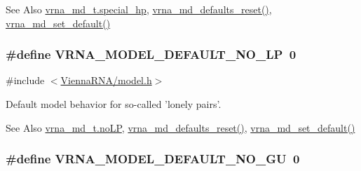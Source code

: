 \begin{DoxySeeAlso}{See Also}
\hyperlink{group__model__details_add64a96d23e77ef1d0ddf8dfc5228143}{vrna\-\_\-md\-\_\-t.\-special\-\_\-hp}, \hyperlink{group__model__details_ga70834424cf804d149937de89f80ceb45}{vrna\-\_\-md\-\_\-defaults\-\_\-reset()}, \hyperlink{group__model__details_ga8ac6ff84936282436f822644bf841f66}{vrna\-\_\-md\-\_\-set\-\_\-default()} 
\end{DoxySeeAlso}
\hypertarget{group__model__details_gab72462726dd60ed0d43339bbf7ee08ad}{
\subsubsection[{V\-R\-N\-A\-\_\-\-M\-O\-D\-E\-L\-\_\-\-D\-E\-F\-A\-U\-L\-T\-\_\-\-N\-O\-\_\-\-L\-P}]{\setlength{\rightskip}{0pt plus 5cm}\#define V\-R\-N\-A\-\_\-\-M\-O\-D\-E\-L\-\_\-\-D\-E\-F\-A\-U\-L\-T\-\_\-\-N\-O\-\_\-\-L\-P~0}}\label{group__model__details_gab72462726dd60ed0d43339bbf7ee08ad}


{\ttfamily \#include $<$\hyperlink{model_8h}{Vienna\-R\-N\-A/model.\-h}$>$}



Default model behavior for so-\/called 'lonely pairs'. 

\begin{DoxySeeAlso}{See Also}
\hyperlink{group__model__details_a753200bf21cee0ea2df64afe43999f5d}{vrna\-\_\-md\-\_\-t.\-no\-L\-P}, \hyperlink{group__model__details_ga70834424cf804d149937de89f80ceb45}{vrna\-\_\-md\-\_\-defaults\-\_\-reset()}, \hyperlink{group__model__details_ga8ac6ff84936282436f822644bf841f66}{vrna\-\_\-md\-\_\-set\-\_\-default()} 
\end{DoxySeeAlso}
\hypertarget{group__model__details_ga34702f7d14d38b877ba8e475281e97e2}{
\subsubsection[{V\-R\-N\-A\-\_\-\-M\-O\-D\-E\-L\-\_\-\-D\-E\-F\-A\-U\-L\-T\-\_\-\-N\-O\-\_\-\-G\-U}]{\setlength{\rightskip}{0pt plus 5cm}\#define V\-R\-N\-A\-\_\-\-M\-O\-D\-E\-L\-\_\-\-D\-E\-F\-A\-U\-L\-T\-\_\-\-N\-O\-\_\-\-G\-U~0}}\label{group__model__details_ga34702f7d14d38b877ba8e475281e97e2}


